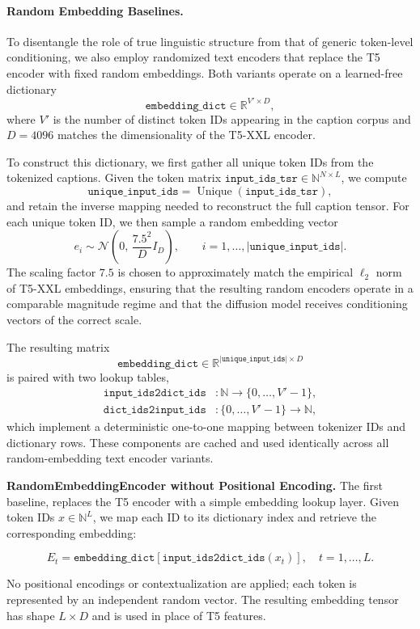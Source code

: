 \paragraph{Random Embedding Baselines.}
To disentangle the role of true linguistic structure from that of generic token-level conditioning, we also employ randomized text encoders that replace the T5 encoder with fixed random embeddings. Both variants operate on a learned-free dictionary
\[
\texttt{embedding\_dict} \in \mathbb{R}^{V' \times D},
\]
where $V'$ is the number of distinct token IDs appearing in the caption corpus and $D=4096$ matches the dimensionality of the T5-XXL encoder.

To construct this dictionary, we first gather all unique token IDs from the tokenized captions. Given the token matrix $\texttt{input\_ids\_tsr} \in \mathbb{N}^{N \times L}$, we compute
\[
\texttt{unique\_input\_ids} = \operatorname{Unique}(\texttt{input\_ids\_tsr}),
\]
and retain the inverse mapping needed to reconstruct the full caption tensor. For each unique token ID, we then sample a random embedding vector
\[
e_i \sim \mathcal{N}\!\left(0,\, \frac{7.5^2}{D} I_D\right), \qquad i = 1,\ldots,|\texttt{unique\_input\_ids}|.
\]
The scaling factor $7.5$ is chosen to approximately match the empirical $\ell_2$ norm of T5-XXL embeddings, ensuring that the resulting random encoders operate in a comparable magnitude regime and that the diffusion model receives conditioning vectors of the correct scale.

The resulting matrix
\[
\texttt{embedding\_dict} \in \mathbb{R}^{|\texttt{unique\_input\_ids}| \times D}
\]
is paired with two lookup tables,
\begin{align*}
\texttt{input\_ids2dict\_ids} &: \mathbb{N} \rightarrow \{0,\ldots,V'-1\}, \\
\texttt{dict\_ids2input\_ids} &: \{0,\ldots,V'-1\} \rightarrow \mathbb{N},
\end{align*}
which implement a deterministic one-to-one mapping between tokenizer IDs and dictionary rows. These components are cached and used identically across all random-embedding text encoder variants. %


\begin{sloppypar}
\textbf{RandomEmbeddingEncoder without Positional Encoding.}
The first baseline, replaces the T5 encoder with a simple embedding lookup layer. Given token IDs $x \in \mathbb{N}^{L}$, we map each ID to its dictionary index and retrieve the corresponding embedding:
\end{sloppypar}
\[
E_{t} = \texttt{embedding\_dict}[\texttt{input\_ids2dict\_ids}(x_t)], \quad t=1,\ldots,L.
\]
\begin{sloppypar}
No positional encodings or contextualization are applied; each token is represented by an independent random vector. The resulting embedding tensor has shape $L \times D$ and is used in place of T5 features.
\end{sloppypar}

